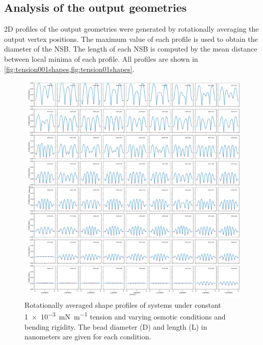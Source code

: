 \documentclass[11pt]{article}
\begin{document}
\subsection{Analysis of the output geometries}

2D profiles of the output geometries were generated by rotationally averaging the output vertex positions.
The maximum value of each profile is used to obtain the diameter of the NSB.
The length of each NSB is computed by the mean distance between local minima of each profile.
All profiles are shown in \cref{fig:tension001shapes,fig:tension01shapes}.

\begin{figure}[htbp!]
    \includegraphics[width=\textwidth]{writeup/Figures/final_shapes_tension0.pdf}
    \caption{Rotationally averaged shape profiles of systems under constant \SI{1e-3}{\milli\newton\per\meter} tension and varying osmotic conditions and bending rigidity.
    The bead diameter (D) and length (L) in nanometers are given for each condition.}
    \label{fig:tension001shapes}
\end{figure}
\end{document}
